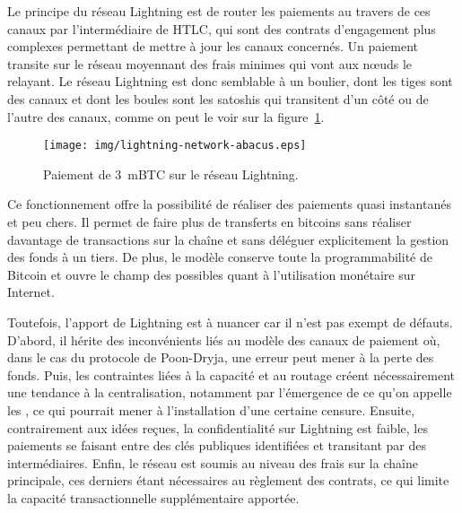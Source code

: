 Le principe du réseau Lightning est de router les paiements au travers de ces canaux par l'intermédiaire de HTLC, qui sont des contrats d'engagement plus complexes permettant de mettre à jour les canaux concernés. Un paiement transite sur le réseau moyennant des frais minimes qui vont aux nœuds le relayant. Le réseau Lightning est donc semblable à un boulier, dont les tiges sont des canaux et dont les boules sont les satoshis qui transitent d'un côté ou de l'autre des canaux, comme on peut le voir sur la figure~\ref{fig:lightning-network-abacus}.

\begin{figure}[ht]
  \centering
  \texttt{[image: img/lightning-network-abacus.eps]}
  \caption{Paiement de 3~mBTC sur le réseau Lightning.}
  \label{fig:lightning-network-abacus}
\end{figure}

Ce fonctionnement offre la possibilité de réaliser des paiements quasi instantanés et peu chers. Il permet de faire plus de transferts en bitcoins sans réaliser davantage de transactions sur la chaîne et sans déléguer explicitement la gestion des fonds à un tiers. De plus, le modèle conserve toute la programmabilité de Bitcoin et ouvre le champ des possibles quant à l'utilisation monétaire sur Internet.

Toutefois, l'apport de Lightning est à nuancer car il n'est pas exempt de défauts. D'abord, il hérite des inconvénients liés au modèle des canaux de paiement où, dans le cas du protocole de Poon-Dryja, une erreur peut mener à la perte des fonds. Puis, les contraintes liées à la capacité et au routage créent nécessairement une tendance à la centralisation, notamment par l'émergence de ce qu'on appelle les , ce qui pourrait mener à l'installation d'une certaine censure. Ensuite, contrairement aux idées reçues, la confidentialité sur Lightning est faible, les paiements se faisant entre des clés publiques identifiées et transitant par des intermédiaires. Enfin, le réseau est soumis au niveau des frais sur la chaîne principale, ces derniers étant nécessaires au règlement des contrats, ce qui limite la capacité transactionnelle supplémentaire apportée.

